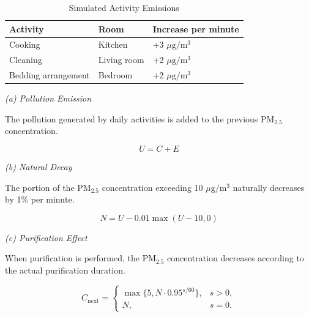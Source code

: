 \documentclass[conference]{IEEEtran}
\newlength{\tablebodywidth}
\newcommand{\pmfine}{\ensuremath{\mathrm{PM}_{2.5}}}
\newcommand{\pmunit}{\ensuremath{\mu\mathrm{g}/\mathrm{m}^3}}
\begin{document}
\begin{table}[!t]
\caption{Simulated Activity Emissions}
\label{tab:t19}
\centering\footnotesize
\setlength{\tabcolsep}{3pt}
\setlength{\tablebodywidth}{\dimexpr\columnwidth-18pt\relax}
\begin{tabular}{>{\raggedright\arraybackslash}p{0.333\tablebodywidth}>{\raggedright\arraybackslash}p{0.333\tablebodywidth}>{\raggedright\arraybackslash}p{0.333\tablebodywidth}}
\toprule
\textbf{Activity} & \textbf{Room} & \textbf{Increase per minute} \\
\midrule
Cooking & Kitchen & +3 \pmunit{} \\
Cleaning & Living room & +2 \pmunit{} \\
Bedding arrangement & Bedroom & +2 \pmunit{} \\
\bottomrule
\end{tabular}
\end{table}

\emph{(a) Pollution Emission}

The pollution generated by daily activities is added to the previous \pmfine{} concentration.

\begin{equation}
U=C+E
\end{equation}

\emph{(b) Natural Decay}

The portion of the \pmfine{} concentration exceeding 10 \pmunit{} naturally decreases by 1\% per minute.

\begin{equation}
N=U-0.01\max(U-10,0)
\end{equation}

\emph{(c) Purification Effect}

When purification is performed, the \pmfine{} concentration decreases according to the actual purification duration.

\begin{equation}
C_{\mathrm{next}}=\begin{cases}\max\{5, N\cdot 0.95^{s/60}\},&s>0,\\ N,&s=0.\end{cases}
\end{equation}
\end{document}
